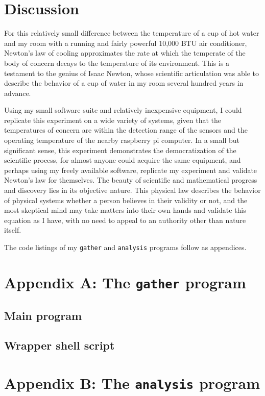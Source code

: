 \documentclass[12pt]{article}
\begin{document}
\section{Discussion}

For this relatively small difference
between the temperature of a cup of hot water
and my room with a running and fairly powerful 10,000 BTU air conditioner,
Newton's law of cooling approximates
the rate at which the temperate of the body of concern
decays to the temperature of its environment.
This is a testament to the genius of Isaac Newton,
whose scientific articulation was able to describe
the behavior of a cup of water in my room
several hundred years in advance.

Using my small software suite
and relatively inexpensive equipment,
I could replicate this experiment
on a wide variety of systems,
given that the temperatures of concern
are within the detection range of the sensors
and the operating temperature of the nearby
raspberry pi computer.
In a small but significant sense,
this experiment demonstrates the democratization of the scientific process,
for almost anyone could acquire the same equipment,
and perhaps using my freely available software,
replicate my experiment and validate Newton's law for themselves.
The beauty of scientific and mathematical progress and discovery
lies in its objective nature.
This physical law describes the behavior of physical systems
whether a person believes in their validity or not,
and the most skeptical mind may take matters into their own hands
and validate this equation as I have,
with no need to appeal to an authority other than nature itself.

\medskip
\noindent
The code listings of my \texttt{gather} and \texttt{analysis} programs follow as appendices.

\section{Appendix A: The \texttt{gather} program} \label{apxA}

\subsection{Main program}



\subsection{Wrapper shell script}



\section{Appendix B: The \texttt{analysis} program} \label{apxB}





\end{document}
